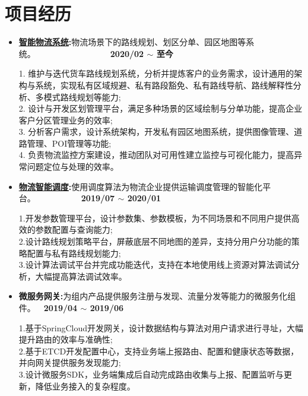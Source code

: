 \documentclass[letterpaper, UTF8, 11pt]{article}
\begin{document}
	\section*{\textbf{项目经历}}\vspace{-0.15in}
	\begin{itemize}	
		\item \textbf{\href{https://lbsyun.baidu.com/solutions/logisticsmap}{智能物流系统}:}{物流场景下的路线规划、划区分单、园区地图等系统。}~~~~~~~~~~~~~~~~~~\textbf{2020/02 $\sim$ 至今}
		
		1. 维护与迭代货车路线规划系统，分析并提炼客户的业务需求，设计通用的架构与系统，实现私有区域规避、私有路段豁免、私有路线导航、路线解释性分析、多模式路线规划等能力;\\
		2. 设计与开发区划管理平台，满足多种场景的区域绘制与分单功能，提高企业客户分区管理业务的效率;\\
		3. 分析客户需求，设计系统架构，开发私有园区地图系统，提供图像管理、道路管理、POI管理等功能;\\
		4. 负责物流监控方案建设，推动团队对可用性建立监控与可视化能力，提高异常问题定位与处理的效率。
		
		\vspace{0.04in}

		\item \textbf{\href{https://lbsyun.baidu.com/solutions/scheduling}{物流智能调度}:}{使用调度算法为物流企业提供运输调度管理的智能化平台。}~~~~~~~~~~~\textbf{2019/07 $\sim$ 2020/01}
		
		1.开发参数管理平台，设计参数集、参数模板，为不同场景和不同用户提供高效的参数配置与查询能力;\\
		2.设计路线规划策略平台，屏蔽底层不同地图的差异，支持分用户分功能的策略配置与私有路线规划能力;\\
		3.设计算法调试平台并完成功能迭代，支持在本地使用线上资源对算法调试分析，大幅提高算法调试效率。
		
		\vspace{0.04in}

		\item \textbf{微服务网关:}{为组内产品提供服务注册与发现、流量分发等能力的微服务化组件。}~~\textbf{2019/04 $\sim$ 2019/06}
		
		1.基于SpringCloud开发网关，设计数据结构与算法对用户请求进行寻址，大幅提升路由的效率与准确性;\\
		2.基于ETCD开发配置中心，支持业务端上报路由、配置和健康状态等数据，并向网关提供服务发现能力;\\
		3.设计微服务SDK，业务端集成后自动完成路由收集与上报、配置监听与更新，降低业务接入的复杂程度。
		

\end{itemize}
\end{document}
